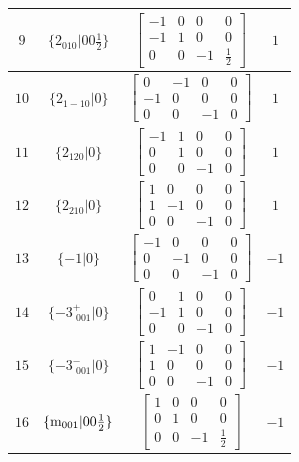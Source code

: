 \documentclass[fleqn,8pt]{jsarticle}
\begin{document}
\begin{longtable}{cccc}
$ 9 $ & $ \{2{}_{010}|0 0 \frac{1}{2}\} $ & $ \begin{bmatrix} -1 & 0 & 0 & 0 \\ -1 & 1 & 0 & 0 \\ 0 & 0 & -1 & \frac{1}{2} \end{bmatrix} $ & $ 1 $ \\ \hline
$ 10 $ & $ \{2{}_{1-10}|0\} $ & $ \begin{bmatrix} 0 & -1 & 0 & 0 \\ -1 & 0 & 0 & 0 \\ 0 & 0 & -1 & 0 \end{bmatrix} $ & $ 1 $ \\ \hline
$ 11 $ & $ \{2{}_{120}|0\} $ & $ \begin{bmatrix} -1 & 1 & 0 & 0 \\ 0 & 1 & 0 & 0 \\ 0 & 0 & -1 & 0 \end{bmatrix} $ & $ 1 $ \\ \hline
$ 12 $ & $ \{2{}_{210}|0\} $ & $ \begin{bmatrix} 1 & 0 & 0 & 0 \\ 1 & -1 & 0 & 0 \\ 0 & 0 & -1 & 0 \end{bmatrix} $ & $ 1 $ \\ \hline
$ 13 $ & $ \{-1|0\} $ & $ \begin{bmatrix} -1 & 0 & 0 & 0 \\ 0 & -1 & 0 & 0 \\ 0 & 0 & -1 & 0 \end{bmatrix} $ & $ -1 $ \\ \hline
$ 14 $ & $ \{-3^{+}_{\,\,001}|0\} $ & $ \begin{bmatrix} 0 & 1 & 0 & 0 \\ -1 & 1 & 0 & 0 \\ 0 & 0 & -1 & 0 \end{bmatrix} $ & $ -1 $ \\ \hline
$ 15 $ & $ \{-3^{-}_{\,\,001}|0\} $ & $ \begin{bmatrix} 1 & -1 & 0 & 0 \\ 1 & 0 & 0 & 0 \\ 0 & 0 & -1 & 0 \end{bmatrix} $ & $ -1 $ \\ \hline
$ 16 $ & $ \{{\rm m}_{001}|0 0 \frac{1}{2}\} $ & $ \begin{bmatrix} 1 & 0 & 0 & 0 \\ 0 & 1 & 0 & 0 \\ 0 & 0 & -1 & \frac{1}{2} \end{bmatrix} $ & $ -1 $ \\ \hline

\end{longtable}
\end{document}
